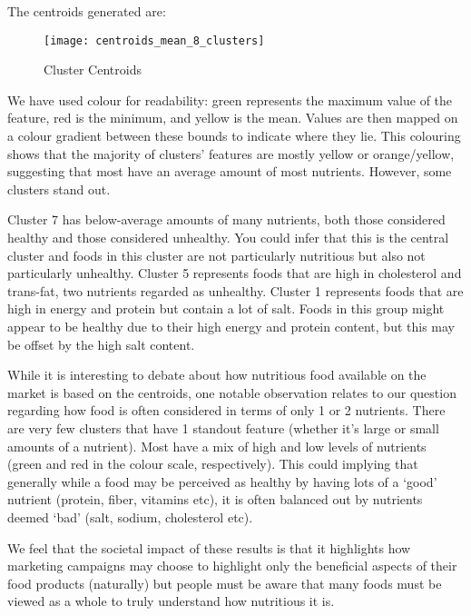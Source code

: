 \documentclass[journal]{IEEEtran}
\begin{document}
The centroids generated are:

\begin{figure}[ht]
\centering
\texttt{[image: centroids\_mean\_8\_clusters]}
\caption{Cluster Centroids}
\label{fig:centroids_mean_8_clusters}
\end{figure}

We have used colour for readability: green represents the maximum value of the feature, red is the minimum, and yellow is the mean. Values are then mapped on a colour gradient between these bounds to indicate where they lie. This colouring shows that the majority of clusters’ features are mostly yellow or orange/yellow, suggesting that most have an average amount of most nutrients. However, some clusters stand out.

Cluster 7 has below-average amounts of many nutrients, both those considered healthy and those considered unhealthy. You could infer that this is the central cluster and foods in this cluster are not particularly nutritious but also not particularly unhealthy. Cluster 5 represents foods that are high in cholesterol and trans-fat, two nutrients regarded as unhealthy. Cluster 1 represents foods that are high in energy and protein but contain a lot of salt. Foods in this group might appear to be healthy due to their high energy and protein content, but this may be offset by the high salt content.

While it is interesting to debate about how nutritious food available on the market is based on the centroids, one notable observation relates to our question regarding how food is often considered in terms of only 1 or 2 nutrients. There are very few clusters that have 1 standout feature (whether it’s large or small amounts of a nutrient). Most have a mix of high and low levels of nutrients (green and red in the colour scale, respectively). This could implying that generally while a food may be perceived as healthy by having lots of a ‘good’ nutrient (protein, fiber, vitamins etc), it is often balanced out by nutrients deemed ‘bad’ (salt, sodium, cholesterol etc).

We feel that the societal impact of these results is that it highlights how marketing campaigns may choose to highlight only the beneficial aspects of their food products (naturally) but people must be aware that many foods must be viewed as a whole to truly understand how nutritious it is.
\end{document}
